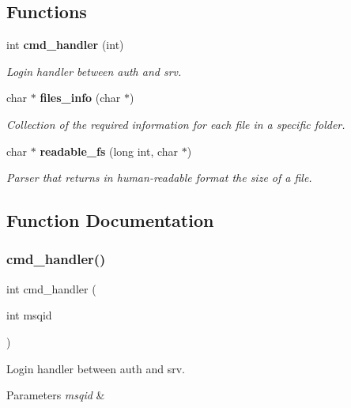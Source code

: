 \subsection*{Functions}
\begin{DoxyCompactItemize}
\item 
int \textbf{ cmd\+\_\+handler} (int)
\begin{DoxyCompactList}\small\item\em Login handler between auth and srv. \end{DoxyCompactList}\item 
char $\ast$ \textbf{ files\+\_\+info} (char $\ast$)
\begin{DoxyCompactList}\small\item\em Collection of the required information for each file in a specific folder. \end{DoxyCompactList}\item 
char $\ast$ \textbf{ readable\+\_\+fs} (long int, char $\ast$)
\begin{DoxyCompactList}\small\item\em Parser that returns in human-\/readable format the size of a file. \end{DoxyCompactList}\end{DoxyCompactItemize}


\subsection{Function Documentation}
\mbox{\label{fileserv_8h_a17e3a23bd1ae378882eab0ef0f856de1}} 
\subsubsection{cmd\+\_\+handler()}
{\footnotesize\ttfamily int cmd\+\_\+handler (\begin{DoxyParamCaption}\item[{int}]{msqid }\end{DoxyParamCaption})}



Login handler between auth and srv. 


\begin{DoxyParams}{Parameters}
{\em msqid} & \\
\hline
\end{DoxyParams}
\mbox{\label{fileserv_8h_a49cfaf7b6d546c559fb0901bd5ba3e65}} 
